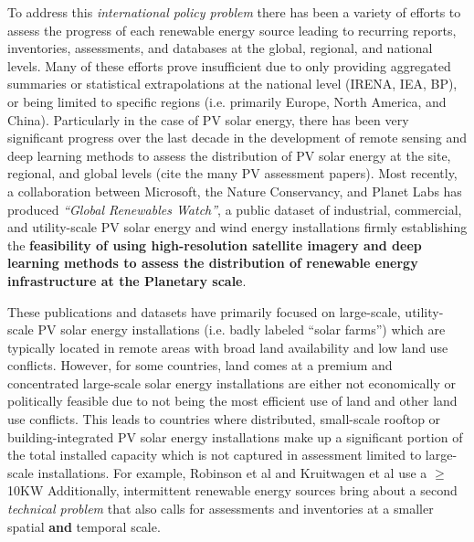 To address this \textit{international policy problem} there has been a variety of efforts to assess the progress of each renewable energy source leading to recurring reports, inventories, assessments, and databases at the global, 
regional, and national levels. Many of these efforts prove insufficient due to only providing aggregated summaries or statistical extrapolations at the national level (IRENA, IEA, BP), or being limited to specific regions 
(i.e. primarily Europe, North America, and China). Particularly in the case of PV solar energy, there has been very significant progress over the last decade in the development of remote sensing and deep learning methods to assess 
the distribution of PV solar energy at the site, regional, and global levels (cite the many PV assessment papers).
Most recently, a collaboration between Microsoft, the Nature Conservancy, and Planet Labs\cite{robinson_ms_planet_global_renewables_watch_2025} has produced \textit{``Global Renewables Watch''}, 
a public dataset of industrial, commercial, and utility-scale PV solar energy and wind energy installations firmly establishing the \textbf{feasibility of using high-resolution satellite imagery and deep learning methods 
to assess the distribution of renewable energy infrastructure at the Planetary scale}.

These publications and datasets have primarily focused on large-scale, utility-scale PV solar energy installations (i.e. badly labeled ``solar farms'') which are 
typically located in remote areas with broad land availability and low land use conflicts. However, for some countries, land comes at a premium and concentrated large-scale solar energy installations are 
either not economically or politically feasible due to not being the most efficient use of land and other land use conflicts. This leads to countries where distributed, small-scale rooftop or building-integrated 
PV solar energy installations make up a significant portion of the total installed capacity which is not captured in assessment limited to large-scale installations. 
For example, Robinson et al\cite{robinson_ms_planet_global_renewables_watch_2025} and Kruitwagen et al\cite{kruitwagen_global_inventory_pv_units_2021} use a $\ge$ 10KW 
Additionally, intermittent renewable energy sources bring about a second \textit{technical problem} that also calls for assessments and inventories at a smaller spatial \textbf{and} temporal scale.

